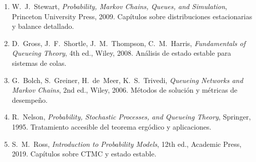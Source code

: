 \documentclass[11pt,a4paper]{article}
\theoremstyle{definition}
\theoremstyle{remark}
\begin{document}
\begin{enumerate}[nosep]
  \item W.~J.~Stewart, \textit{Probability, Markov Chains, Queues, and
        Simulation}, Princeton University Press, 2009.
        Capítulos sobre distribuciones estacionarias y balance detallado.
  \item D.~Gross, J.~F.~Shortle, J.~M.~Thompson, C.~M.~Harris,
        \textit{Fundamentals of Queueing Theory}, 4th ed., Wiley, 2008.
        Análisis de estado estable para sistemas de colas.
  \item G.~Bolch, S.~Greiner, H.~de~Meer, K.~S.~Trivedi,
        \textit{Queueing Networks and Markov Chains}, 2nd ed., Wiley, 2006.
        Métodos de solución y métricas de desempeño.
  \item R.~Nelson, \textit{Probability, Stochastic Processes, and Queueing
        Theory}, Springer, 1995.
        Tratamiento accesible del teorema ergódico y aplicaciones.
  \item S.~M.~Ross, \textit{Introduction to Probability Models}, 12th ed.,
        Academic Press, 2019.  Capítulos sobre CTMC y estado estable.
\end{enumerate}
\end{document}
